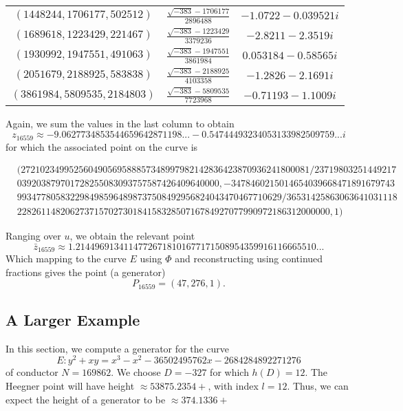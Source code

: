 \begin{center}
\begin{tabular}{| c | c | c |}
$(1448244, 1706177, 502512)$ & $\frac{\sqrt{-383} - 1706177}{2896488}$ & $-1.0722 - 0.039521i$\\
$(1689618, 1223429, 221467)$ & $\frac{\sqrt{-383} - 1223429}{3379236}$ & $-2.8211 - 2.3519i$\\
$(1930992, 1947551, 491063)$ & $\frac{\sqrt{-383} - 1947551}{3861984}$ & $0.053184 - 0.58565i$\\
$(2051679, 2188925, 583838)$ & $\frac{\sqrt{-383} - 2188925}{4103358}$ & $-1.2826 - 2.1691i$\\
$(3861984, 5809535, 2184803)$ & $\frac{\sqrt{-383} - 5809535}{7723968}$ & $-0.71193 - 1.1009i$\\
\hline
\end{tabular}
\end{center}
Again, we sum the values in the last column to obtain
$$z_{16559} \approx -9.0627734853544659642871198... - 0.54744493234053133982509759...i$$
for which the associated point on the curve is
\begin{small}
\begin{align*}
&(272102349952560490569588857348997982142836423870936241800081/23719803251449217\\ &039203879701728255083093757587426409640000 ,-3478460215014654039668471891679743\\ &9934778058322984985964898737508492956824043470467710629/36531425863063641031118\\ &22826114820627371570273018415832850716784927077990972186312000000 , 1)
\end{align*}
\end{small}
Ranging over $u$, we obtain the relevant point
$$\bar{z}_{16559} \approx 1.21449691341147726718101677171508954359916116665510...$$
Which mapping to the curve $E$ using $\Phi$ and reconstructing using continued fractions gives the point (a generator)
$$P_{16559} = (47,276,1).$$



\subsection{A Larger Example}
In this section, we compute a generator for the curve 
$$E:y^2 + xy = x^3 - x^2 - 36502495762x - 2684284892271276$$
of conductor $N = 169862$. We choose $D = -327$ for which $h(D) = 12$. The Heegner point will have height $\approx 53875.2354+$, with index $l = 12$. Thus, we can expect the height of a generator to be $\approx 374.1336+$


